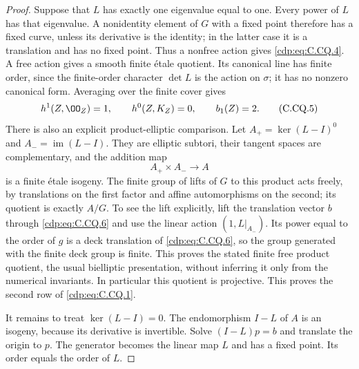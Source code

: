 \begin{proof}
Suppose that $L$ has exactly one eigenvalue equal to
one. Every power of $L$ has that eigenvalue. A
nonidentity element of $G$ with a fixed point therefore
has a fixed curve, unless its derivative is the
identity; in the latter case it is a translation and
has no fixed point. Thus a nonfree action gives
\eqref{cdp:eq:C.CQ.4}. A free action gives a smooth finite
\'etale quotient. Its canonical line has finite order,
since the finite-order character $\det L$ is the
action on $\sigma$; it has no nonzero canonical
form. Averaging over the finite cover gives
\[
 h^1(Z,\OO_Z)=1,\qquad h^0(Z,K_Z)=0,\qquad
                  b_1(Z)=2 .
                                                               \tag{C.CQ.5}\label{cdp:eq:C.CQ.5}
\]
There is also an explicit product-elliptic comparison.
Let
$A_+=\ker(L-I)^0$ and $A_-=\operatorname{im}(L-I)$.
They are elliptic subtori, their tangent spaces are
complementary, and the addition map
\[
                  A_+\times A_-\longrightarrow A
                                                               \tag{C.CQ.6}\label{cdp:eq:C.CQ.6}
\]
is a finite \'etale isogeny. The finite group of lifts
of $G$ to this product acts freely, by translations
on the first factor and affine automorphisms on the
second; its quotient is exactly $A/G$. To see the
lift explicitly, lift the translation vector $b$
through \eqref{cdp:eq:C.CQ.6} and use the linear action
$(1,L|_{A_-})$. Its power equal to the order of $g$
is a deck translation of \eqref{cdp:eq:C.CQ.6}, so the group
generated with the finite deck group is finite.
This proves the stated finite free product quotient,
the usual bielliptic presentation, without inferring
it only from the numerical invariants. In particular
this quotient is projective. This proves the second
row of \eqref{cdp:eq:C.CQ.1}.

It remains to treat $\ker(L-I)=0$. The endomorphism
$I-L$ of $A$ is an isogeny, because its derivative
is invertible. Solve $(I-L)p=b$ and translate the
origin to $p$. The generator becomes the linear
map $L$ and has a fixed point. Its order equals
the order of $L$.


\end{proof}
